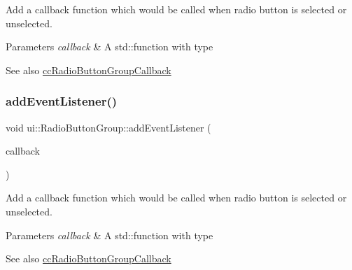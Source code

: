 Add a callback function which would be called when radio button is selected or unselected. 
\begin{DoxyParams}{Parameters}
{\em callback} & A std\+::function with type \\
\hline
\end{DoxyParams}
\begin{DoxySeeAlso}{See also}
{\ttfamily \hyperlink{classui_1_1RadioButtonGroup_a8385f08613e843c5977252ed03c37e22}{cc\+Radio\+Button\+Group\+Callback}} 
\end{DoxySeeAlso}
\mbox{\label{classui_1_1RadioButtonGroup_a22663b5cf32d32749ced9005888e937f}} 
\subsubsection{\texorpdfstring{add\+Event\+Listener()}{addEventListener()}\hspace{0.1cm}{\footnotesize\ttfamily [2/2]}}
{\footnotesize\ttfamily void ui\+::\+Radio\+Button\+Group\+::add\+Event\+Listener (\begin{DoxyParamCaption}\item[{const \hyperlink{classui_1_1RadioButtonGroup_a8385f08613e843c5977252ed03c37e22}{cc\+Radio\+Button\+Group\+Callback} \&}]{callback }\end{DoxyParamCaption})}

Add a callback function which would be called when radio button is selected or unselected. 
\begin{DoxyParams}{Parameters}
{\em callback} & A std\+::function with type \\
\hline
\end{DoxyParams}
\begin{DoxySeeAlso}{See also}
{\ttfamily \hyperlink{classui_1_1RadioButtonGroup_a8385f08613e843c5977252ed03c37e22}{cc\+Radio\+Button\+Group\+Callback}} 
\end{DoxySeeAlso}
\mbox{\label{classui_1_1RadioButtonGroup_ae9b744703cc5ca6fbb404c96fb8d040d}} 
